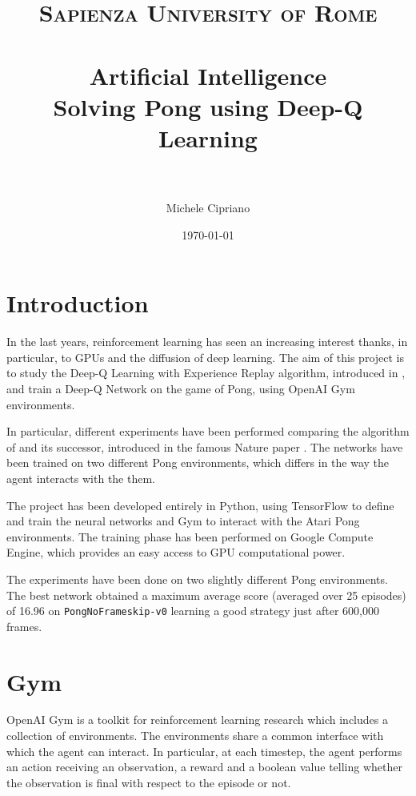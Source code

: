 \documentclass[a4paper]{article}
\title{
\normalfont \normalsize
\textsc{Sapienza University of Rome} \\ [25pt] %
\horrule{0.5pt} \\[0.4cm] %
\LARGE Artificial Intelligence \\ %
\large Solving Pong using Deep-Q Learning \\
\horrule{2pt} \\[0.5cm] %
}
\author{Michele Cipriano} %
\date{\normalsize\today} %
\numberwithin{equation}{section} %
\numberwithin{figure}{section} %
\numberwithin{table}{section} %
\theoremstyle{definition}
\begin{document}
\sloppy %

\maketitle %


\section{Introduction}

In the last years, reinforcement learning has seen an increasing interest thanks,
in particular, to GPUs and the diffusion of deep learning. The aim of this
project is to study the Deep-Q Learning with Experience Replay
algorithm, introduced in \cite{mnih2013playing}, and train
a Deep-Q Network on the game of Pong, using OpenAI Gym environments\cite{openai-gym}.

In particular, different experiments have been performed comparing the algorithm
of \cite{mnih2013playing} and its successor, introduced in the famous Nature
paper \cite{mnih2015humanlevel}. The networks have been trained on two different
Pong environments, which differs in the way the agent interacts with the them.

The project has been developed entirely in Python, using TensorFlow to define and
train the neural networks and Gym to interact with the Atari Pong environments.
The training phase has been performed on Google Compute Engine, which provides an
easy access to GPU computational power.

The experiments have been done on two slightly different Pong environments.
The best network obtained a maximum average score (averaged over 25 episodes) of
16.96 on \texttt{PongNoFrameskip-v0} learning a good
strategy just after 600,000 frames.


\section{Gym}

OpenAI Gym is a toolkit for reinforcement learning research which includes a
collection of environments. The environments share a common interface with which
the agent can interact. In particular, at each timestep, the agent performs an
action receiving an observation, a reward and a boolean value telling whether the
observation is final with respect to the episode or not.
\end{document}
